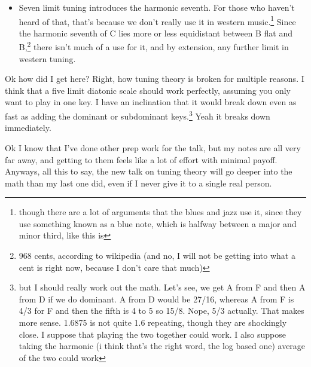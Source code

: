 \documentclass[12pt]{article}[titlepage]
\newcommand{\1}{\={a}}
\newcommand{\2}{\={e}}
\newcommand{\3}{\={\i}}
\newcommand{\4}{\=o}
\newcommand{\5}{\=u}
\newcommand{\6}{\={A}}
\renewcommand{\,}{\textsuperscript{,}}
\begin{document}
\begin{itemize}
The third in 3 limit tuning is\footnote{ok some quick math: 3/2 is G, 3/2 times 3/2 is 9/8 (octave equiv) is D, 3/2 more is 27/16 is A, 81/64 is E. 1.265} 81:64, which is not quite the same.
From this, you only need F, C, and G to produce a diatonic scale! Wow, progress
\item Seven limit tuning introduces the harmonic seventh.
For those who haven't heard of that, that's because we don't really use it in western music.\footnote{though there are a lot of arguments that the blues and jazz use it, since they use something known as a blue note, which is halfway between a major and minor third, like this is}
Since the harmonic seventh of C lies more or less equidistant between B flat and B,\footnote{968 cents, according to wikipedia (and no, I will not be getting into what a cent is right now, because I don't care that much)} there isn't much of a use for it, and by extension, any further limit in western tuning.
\end{itemize}
Ok how did I get here?
Right, how tuning theory is broken for multiple reasons.
I think that a five limit diatonic scale should work perfectly, assuming you only want to play in one key.
I have an inclination that it would break down even as fast as adding the dominant or subdominant keys.\footnote{but I should really work out the math. Let's see, we get A from F and then A from D if we do dominant. A from D would be 27/16, whereas A from F is 4/3 for F and then the fifth is 4 to 5 so 15/8. Nope, 5/3 actually. That makes more sense. 1.6875 is not quite 1.6 repeating, though they are shockingly close.
I suppose that playing the two together could work.
I also suppose taking the harmonic (i think that's the right word, the log based one) average of the two could work}
Yeah it breaks down immediately.

Ok I know that I've done other prep work for the talk, but my notes are all very far away, and getting to them feels like a lot of effort with minimal payoff.
Anyways, all this to say, the new talk on tuning theory will go deeper into the math than my last one did, even if I never give it to a single real person.
\end{document}
